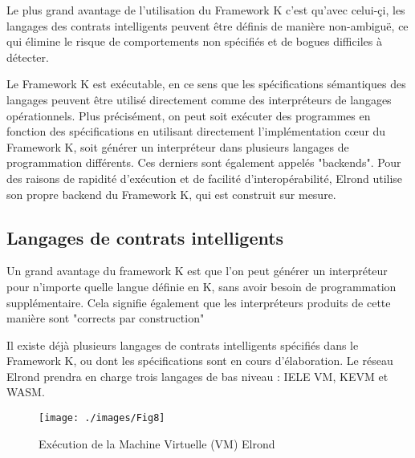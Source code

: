 \documentclass[journal]{IEEEtran}
\begin{document}
Le plus grand avantage de l'utilisation du Framework K c'est qu'avec celui-çi, les langages des contrats intelligents peuvent être définis de manière non-ambiguë, ce qui élimine le risque de comportements non spécifiés et de bogues difficiles à détecter.

Le Framework K est exécutable, en ce sens que les spécifications sémantiques des langages peuvent être utilisé directement comme des interpréteurs de langages opérationnels. Plus précisément, on peut soit exécuter des programmes en fonction des spécifications en utilisant directement l'implémentation cœur du Framework K, soit générer un interpréteur dans plusieurs langages de programmation différents. Ces derniers sont également appelés "backends". Pour des raisons de rapidité d'exécution et de facilité d'interopérabilité, Elrond utilise son propre backend du Framework K, qui est construit sur mesure.

\subsection{Langages de contrats intelligents}
Un grand avantage du framework K est que l'on peut générer un interpréteur pour n'importe quelle langue définie en K, sans avoir besoin de programmation supplémentaire. Cela signifie également que les interpréteurs produits de cette manière sont "corrects par construction"

Il existe déjà plusieurs langages de contrats intelligents spécifiés dans le Framework K, ou dont les spécifications sont en cours d'élaboration. Le réseau Elrond prendra en charge trois langages de bas niveau : IELE VM, KEVM et WASM.

 \begin{figure}[h]
	\texttt{[image: ./images/Fig8]} %
	\caption{Exécution de la Machine Virtuelle (VM) Elrond} %
	\label{Fig.8} %
\end{figure}
\end{document}
